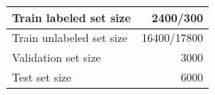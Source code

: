 \begin{tabular}{L{\WWW}  R{\RRR}}
\\ \hline
Train labeled set size & 2400/300
\\ \hline
Train unlabeled set size & 16400/17800
\\ \hline
Validation set size & 3000
\\ \hline
Test set size & 6000
\end{tabular}
